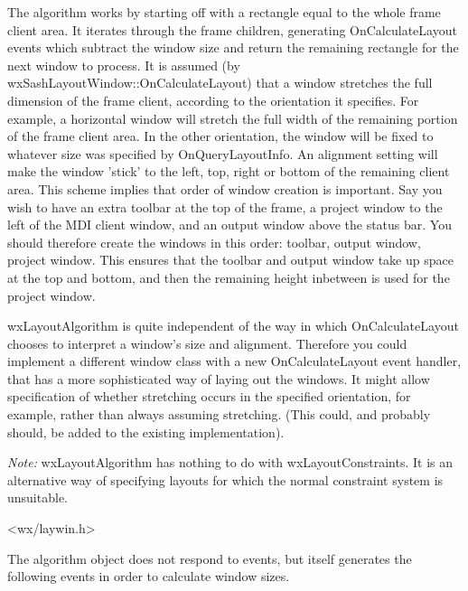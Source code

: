 The algorithm works by starting off with a rectangle equal to the whole frame client area.
It iterates through the frame children, generating OnCalculateLayout events which subtract
the window size and return the remaining rectangle for the next window to process. It
is assumed (by wxSashLayoutWindow::OnCalculateLayout) that a window stretches the full dimension
of the frame client, according to the orientation it specifies. For example, a horizontal window
will stretch the full width of the remaining portion of the frame client area.
In the other orientation, the window will be fixed to whatever size was specified by
OnQueryLayoutInfo. An alignment setting will make the window 'stick' to the left, top, right or
bottom of the remaining client area. This scheme implies that order of window creation is important.
Say you wish to have an extra toolbar at the top of the frame, a project window to the left of
the MDI client window, and an output window above the status bar. You should therefore create
the windows in this order: toolbar, output window, project window. This ensures that the toolbar and
output window take up space at the top and bottom, and then the remaining height inbetween is used for
the project window.

wxLayoutAlgorithm is quite independent of the way in which
OnCalculateLayout chooses to interpret a window's size and alignment. Therefore you
could implement a different window class with a new OnCalculateLayout event handler,
that has a more sophisticated way of laying out the windows. It might allow
specification of whether stretching occurs in the specified orientation, for example,
rather than always assuming stretching. (This could, and probably should, be added to the existing
implementation).

{\it Note:} wxLayoutAlgorithm has nothing to do with wxLayoutConstraints. It is an alternative
way of specifying layouts for which the normal constraint system is unsuitable.




<wx/laywin.h>


The algorithm object does not respond to events, but itself generates the
following events in order to calculate window sizes.

\twocolwidtha{7cm}%
\begin{twocollist}\itemsep=0pt
\end{twocollist}

